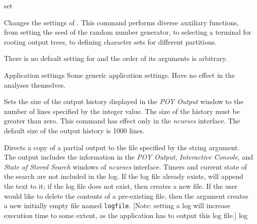 \begin{command}{set}{}


    \begin{poydescription}
        Changes the settings of \poy. This command performs diverse auxiliary 
        functions, from setting the seed of the random number generator, to
        selecting a terminal for rooting output trees, to defining character sets
        for different partitions.
        
        There is no default setting for  and the order of its
        arguments is arbitrary.
            
    \end{poydescription}

    \begin{arguments}

        \begin{argumentgroup}{Application settings}
            {Some generic application settings. Have no effect in the analyses
            themselves.}
             
                {Sets the size of the \poy output history displayed in the
                \emph{POY Output} window to the number of lines specified by the
                integer value. The size of the history must be greater than
                zero. This command has effect only in the \emph{ncurses} interface. The
                default size of the output history is 1000 lines.}
                 {}

                {Directs a copy of a partial output to the file specified by the
                string  argument. The output includes the  information in the
                \emph{POY Output}, \emph{Interactive Console}, and \emph{State
                of Stored Search} windows of \emph{ncurses} interface.  Timers and
                current state of the search are not included in the log. If the
                log file already exists, \poy will append the text to it; if the log
                file does not exist, then \poy creates a new file. If the user
                would like to delete the contents of a pre-existing file, then
                the argument  creates a new
                initially empty file named \texttt{logfile}. [Note: setting a log will 
                increase execution time to some extent, as the application has
                to output this log file.]}
                {log}


\end{argumentgroup}
\end{arguments}
\end{command}
